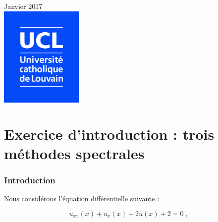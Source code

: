 \documentclass{report}
\begin{document}
\begin{titlepage}


{\large Janvier 2017}\\[1.5cm] %


\includegraphics[width=4cm]{Logo_UCL_SCIENCES.jpg}\\[1cm] %
 

\vfill %

\end{titlepage}


\part{Exercice d'introduction : trois méthodes spectrales}

\section{Introduction}
Nous considérons l'équation différentielle suivante :

\begin{equation}\label{eq:main}
u_{xx}(x) + u_x(x) - 2u(x) + 2= 0\;,
\end{equation}
\end{document}
